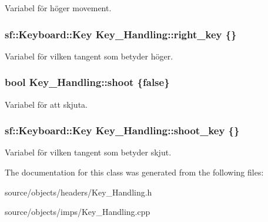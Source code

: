 Variabel för höger movement. 

\hypertarget{classKey__Handling_a802f80c79ced68d848e1297438c1627e}{
\subsubsection[{right\+\_\+key}]{\setlength{\rightskip}{0pt plus 5cm}sf\+::\+Keyboard\+::\+Key Key\+\_\+\+Handling\+::right\+\_\+key \{\}}}\label{classKey__Handling_a802f80c79ced68d848e1297438c1627e}


Variabel för vilken tangent som betyder höger. 

\hypertarget{classKey__Handling_ae9d219c1a9387620c14120d9a45d5db1}{
\subsubsection[{shoot}]{\setlength{\rightskip}{0pt plus 5cm}bool Key\+\_\+\+Handling\+::shoot \{false\}}}\label{classKey__Handling_ae9d219c1a9387620c14120d9a45d5db1}


Variabel för att skjuta. 

\hypertarget{classKey__Handling_a73d59e5daa95dc140adda8cfd677e189}{
\subsubsection[{shoot\+\_\+key}]{\setlength{\rightskip}{0pt plus 5cm}sf\+::\+Keyboard\+::\+Key Key\+\_\+\+Handling\+::shoot\+\_\+key \{\}}}\label{classKey__Handling_a73d59e5daa95dc140adda8cfd677e189}


Variabel för vilken tangent som betyder skjut. 



The documentation for this class was generated from the following files\+:\begin{DoxyCompactItemize}
\item 
source/objects/headers/Key\+\_\+\+Handling.\+h\item 
source/objects/imps/Key\+\_\+\+Handling.\+cpp\end{DoxyCompactItemize}
